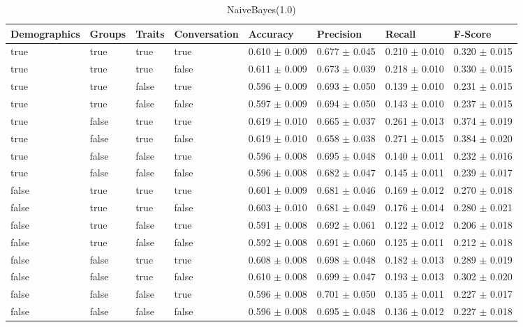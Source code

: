 \begin{table}[h]
	\centering
	\begin{tabular}{|l|l|l|l|l|l|l|l|} %
	\hline
	Demographics & Groups & Traits & Conversation & Accuracy & Precision & Recall & F-Score \\ \hline
	true & true & true & true & 0.610	\( \pm \) 0.009	& 0.677	\( \pm \) 0.045	& 0.210	\( \pm \) 0.010	& 0.320	\( \pm \) 0.015	\\ \hline
	true & true & true & false & 0.611	\( \pm \) 0.009	& 0.673	\( \pm \) 0.039	& 0.218	\( \pm \) 0.010	& 0.330	\( \pm \) 0.015	\\ \hline
	true & true & false & true & 0.596	\( \pm \) 0.009	& 0.693	\( \pm \) 0.050	& 0.139	\( \pm \) 0.010	& 0.231	\( \pm \) 0.015	\\ \hline
	true & true & false & false & 0.597	\( \pm \) 0.009	& 0.694	\( \pm \) 0.050	& 0.143	\( \pm \) 0.010	& 0.237	\( \pm \) 0.015	\\ \hline
	true & false & true & true & 0.619	\( \pm \) 0.010	& 0.665	\( \pm \) 0.037	& 0.261	\( \pm \) 0.013	& 0.374	\( \pm \) 0.019	\\ \hline
	true & false & true & false & 0.619	\( \pm \) 0.010	& 0.658	\( \pm \) 0.038	& 0.271	\( \pm \) 0.015	& 0.384	\( \pm \) 0.020	\\ \hline
	true & false & false & true & 0.596	\( \pm \) 0.008	& 0.695	\( \pm \) 0.048	& 0.140	\( \pm \) 0.011	& 0.232	\( \pm \) 0.016	\\ \hline
	true & false & false & false & 0.596	\( \pm \) 0.008	& 0.682	\( \pm \) 0.047	& 0.145	\( \pm \) 0.011	& 0.239	\( \pm \) 0.017	\\ \hline
	false & true & true & true & 0.601	\( \pm \) 0.009	& 0.681	\( \pm \) 0.046	& 0.169	\( \pm \) 0.012	& 0.270	\( \pm \) 0.018	\\ \hline
	false & true & true & false & 0.603	\( \pm \) 0.010	& 0.681	\( \pm \) 0.049	& 0.176	\( \pm \) 0.014	& 0.280	\( \pm \) 0.021	\\ \hline
	false & true & false & true & 0.591	\( \pm \) 0.008	& 0.692	\( \pm \) 0.061	& 0.122	\( \pm \) 0.012	& 0.206	\( \pm \) 0.018	\\ \hline
	false & true & false & false & 0.592	\( \pm \) 0.008	& 0.691	\( \pm \) 0.060	& 0.125	\( \pm \) 0.011	& 0.212	\( \pm \) 0.018	\\ \hline
	false & false & true & true & 0.608	\( \pm \) 0.008	& 0.698	\( \pm \) 0.048	& 0.182	\( \pm \) 0.013	& 0.289	\( \pm \) 0.019	\\ \hline
	false & false & true & false & 0.610	\( \pm \) 0.008	& 0.699	\( \pm \) 0.047	& 0.193	\( \pm \) 0.013	& 0.302	\( \pm \) 0.020	\\ \hline
	false & false & false & true & 0.596	\( \pm \) 0.008	& 0.701	\( \pm \) 0.050	& 0.135	\( \pm \) 0.011	& 0.227	\( \pm \) 0.017	\\ \hline
	false & false & false & false & 0.596	\( \pm \) 0.008	& 0.695	\( \pm \) 0.048	& 0.136	\( \pm \) 0.012	& 0.227	\( \pm \) 0.018	\\ \hline
	\end{tabular}
	\caption{NaiveBayes(1.0)}
	\label{tab:revpol}
\end{table}
